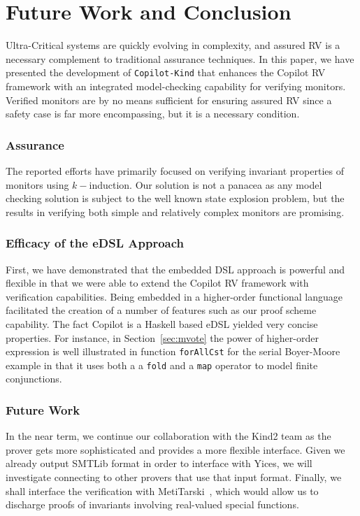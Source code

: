 \section{Future Work and Conclusion}\label{sec:conclusion}

 Ultra-Critical systems are quickly evolving in complexity, and assured
 RV is a necessary complement to traditional assurance techniques.  
In this paper, we have presented the development of
\texttt{Copilot-Kind} that enhances the Copilot RV framework with an
integrated model-checking capability for verifying monitors.
Verified  monitors are by no means sufficient for ensuring assured RV
since a safety case is far more encompassing, but it is a necessary
condition.


\subsubsection{Assurance} The reported efforts have
primarily focused on verifying invariant properties of monitors using
$k-$induction. Our solution is not a panacea as any model checking
solution is subject to the well known state explosion problem, but 
the results in verifying both simple and relatively complex monitors
are promising. 

\subsubsection{Efficacy of the eDSL Approach} First, we have
demonstrated that the embedded DSL approach is powerful and flexible
in that we were able to extend the Copilot RV framework with
verification capabilities. Being embedded in a  higher-order functional language
facilitated the creation of  a number of features such as our proof
scheme capability. The fact Copilot is a Haskell based eDSL yielded
very  concise properties. For instance, in Section~\ref{sec:mvote}
the power of higher-order expression is well illustrated in 
function  \texttt{forAllCst} for the
serial Boyer-Moore example in that it  uses both a  a \texttt{fold}
and a \texttt{map} operator to model finite conjunctions. 


\subsubsection{Future Work} In the near term, we continue our
collaboration with the Kind2 team as the prover gets more
sophisticated and provides a more flexible interface. Given we already
output SMTLib format in order to interface with Yices, we will
investigate connecting to other provers that use that input
format. Finally, we shall interface the verification with
MetiTarski~\cite{AkbarpourPaulson}, which would allow us to discharge
proofs of invariants involving real-valued special functions.


